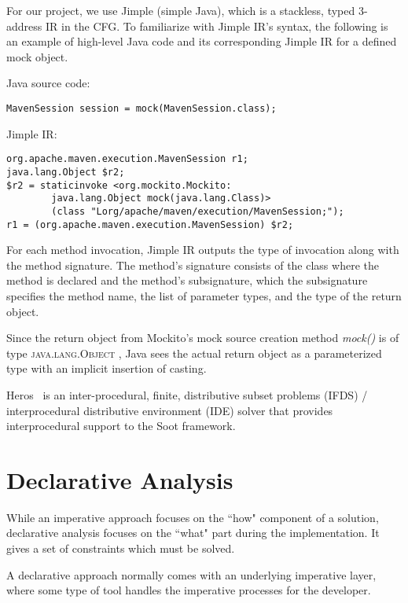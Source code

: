 For our project, we use Jimple (simple Java), which is a stackless, typed 3-address IR in the CFG. To familiarize with Jimple IR's syntax, the following is an example of high-level Java code and its corresponding Jimple IR for a defined mock object.

Java source code:
\begin{lstlisting}[basicstyle=\linespread{1.0}\ttfamily\small,numbers=none]
MavenSession session = mock(MavenSession.class);
\end{lstlisting}

Jimple IR:
\begin{lstlisting}[basicstyle=\linespread{1.0}\ttfamily\small,numbers=none]
org.apache.maven.execution.MavenSession r1;
java.lang.Object $r2;
$r2 = staticinvoke <org.mockito.Mockito:
		java.lang.Object mock(java.lang.Class)>
		(class "Lorg/apache/maven/execution/MavenSession;");
r1 = (org.apache.maven.execution.MavenSession) $r2;
\end{lstlisting}

For each method invocation, Jimple IR outputs the type of invocation along with the method signature. The method's signature consists of the class where the method is declared and the method's subsignature, which the subsignature specifies the method name, the list of parameter types, and the type of the return object. 

Since the return object from Mockito's mock source creation method \textit{mock()} is of type \textsc{java.lang.Object} , Java sees the actual return object as a parameterized type with an implicit insertion of casting. 

Heros~\cite{bodden12:_inter_proced_data_flow_analy} is an inter-procedural, finite, distributive subset problems (IFDS) / interprocedural distributive environment (IDE) solver that provides interprocedural support to the Soot framework.

\section{Declarative Analysis}

While an imperative approach focuses on the ``how" component of a solution, declarative analysis focuses on the ``what" part during the implementation. It gives a set of constraints which must be solved.

A declarative approach normally comes with an underlying imperative layer, where some type of tool handles the imperative processes for the developer.

